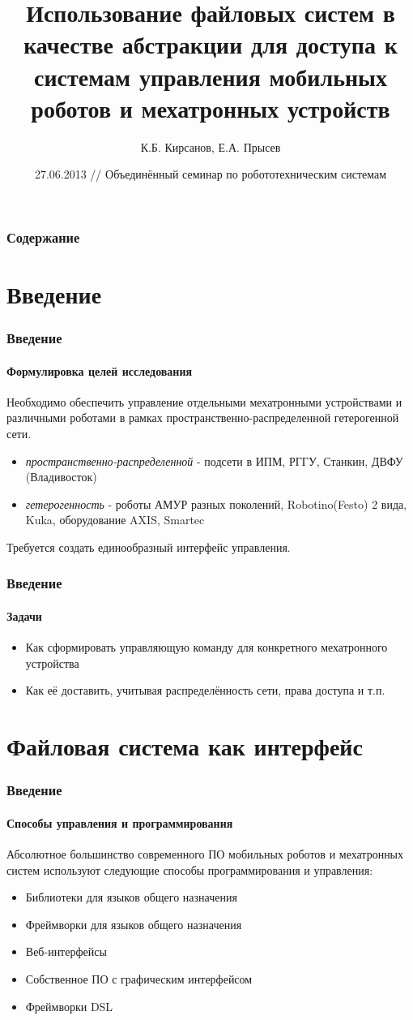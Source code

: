 \documentclass{beamer}
\title{ Использование файловых систем в качестве абстракции для доступа к
системам управления мобильных роботов и мехатронных устройств}
\author{К.Б. Кирсанов, Е.А. Прысев}
\date{27.06.2013 // Объединённый семинар по робототехническим системам}
\begin{document}
\begin{frame}
\titlepage
\end{frame}

\begin{frame}
\frametitle{Содержание}
\tableofcontents
\end{frame}


\section{Введение}
\begin{frame}
\frametitle{Введение}
\framesubtitle{Формулировка целей исследования}

Необходимо обеспечить управление отдельными мехатронными устройствами и
различными роботами в рамках пространственно-распределенной гетерогенной сети.
\begin{itemize}
  \item<1>\emph{пространственно-распределенной} -  подсети в ИПМ, РГГУ, Станкин,
	ДВФУ (Владивосток)
  \item<1>\emph{гетерогенность} -  роботы АМУР разных поколений,
  Robotino(Festo) 2 вида, Kuka, оборудование AXIS, Smartec
\end{itemize}

Требуется создать единообразный интерфейс управления.
\end{frame}

\begin{frame}
\frametitle{Введение}
\framesubtitle{Задачи}
\begin{itemize}
 	\item<1>Как сформировать управляющую команду для конкретного
 	мехатронного устройства
 	\item<1>Как её доставить, учитывая распределённость
 	сети, права доступа и т.п.
\end{itemize}
\end{frame}

\section{Файловая система как интерфейс}
\begin{frame}
\frametitle{Введение}
\framesubtitle{Способы управления и программирования}
Абсолютное большинство современного ПО мобильных роботов и мехатронных систем
используют следующие способы программирования и управления:
\begin{itemize}
 	\item<1> Библиотеки для языков общего назначения
	\item<1> Фреймворки для языков общего назначения
	\item<1> Веб-интерфейсы
	\item<1> Собственное ПО с графическим интерфейсом
	\item<1> Фреймворки DSL
\end{itemize}

\end{frame}
\end{document}
